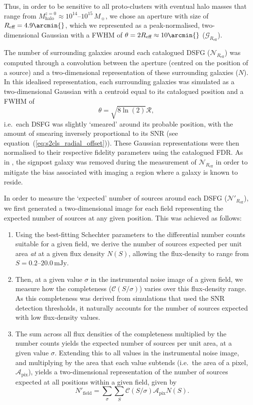 \documentclass[a4paper, fleqn, usenatbib]{mnras}
\newcommand{\millijanksy}{\text{mJy}}
\newcommand{\mhalo}{M_{\text{halo}}}
\newcommand{\msol}{M_{\sun}}
\newcommand{\reff}{R_{\text{eff}}}
\begin{document}
Thus, in order to be sensitive to all proto-clusters with eventual halo masses that range from $\mhalo^{z=0}\approx10^{14}\text{--}10^{15}\,\msol{}$, we chose an aperture with size of $\reff{}=4.9\arcmin{}$, which we represented as a peak-normalised, two-dimensional Gaussian with a FWHM of $\theta=2\reff{}\approx10\arcmin{}$ ($\mathcal{G}_{\reff{}}$).

The number of surrounding galaxies around each catalogued DSFG ($\mathcal{N}_{\reff{}}$) was computed through a convolution between the aperture (centred on the position of a source) and a two-dimensional representation of these surrounding galaxies ($N$).
In this idealised representation, each surrounding galaxies was simulated as a two-dimensional Gaussian with a centroid equal to its catalogued position and a FWHM of $$\theta=\sqrt{8\ln(2)}\mathcal{R},$$ i.e.\ each DSFG was slightly `smeared' around its probable position, with the amount of smearing inversely proportional to its SNR (see equation~(\ref{eq:s2cls_radial_offset})).
These Gaussian representations were then normalised to their respective fidelity parameters using the catalogued FDR.
As in , the signpost galaxy was removed during the measurement of $\mathcal{N}_{\reff{}}$ in order to mitigate the bias associated with imaging a region where a galaxy is known to reside.

In order to measure the `expected' number of sources around each DSFG ($\mathcal{N}'_{\reff{}}$), we first generated a two-dimensional image for each field representing the expected number of sources at any given position.
This was achieved as follows:

\begin{enumerate}
    \item Using the best-fitting Schechter parameters to the differential number counts suitable for a given field, we derive the number of sources expected per unit area \emph{at} at a given flux density $N(S)$, allowing the flux-density to range from $S=0.2\text{--}20.0\,\millijanksy{}$.
    \item Then, at a given value $\sigma$ in the instrumental noise image of a given field, we measure how the completeness ($\mathcal{C}(S/\sigma)$) varies over this flux-density range.
    As this completeness was derived from simulations that used the SNR detection thresholds, it naturally accounts for the number of sources expected with low flux-density values.
    \item The sum across all flux densities of the completeness multiplied by the number counts yields the expected number of sources per unit area, at a given value $\sigma$.
    Extending this to all values in the instrumental noise image, and multiplying by the area that each value subtends (i.e.\ the area of a pixel, $\mathcal{A}_{\text{pix}}$), yields a two-dimensional representation of the number of sources expected at all positions within a given field, given by $$
        N'_{\text{field}}=\sum_\sigma\sum_S \mathcal{C}(S/\sigma)\mathcal{A}_{\text{pix}}N(S).$$
\end{enumerate}
\end{document}

